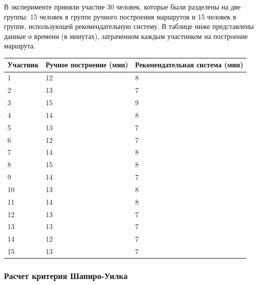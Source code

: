 В эксперименте приняли участие 30 человек, которые были разделены на две группы: 15 человек в группе ручного построения маршрутов и 15 человек в группе, использующей рекомендательную систему. В таблице ниже представлены данные о времени (в минутах), затраченном каждым участником на построение маршрута.

\begin{center}
	\label{tab:experiment_result}
	\begin{tabular}{|l|l|l|}
\hline
Участник & Ручное построение (мин) & Рекомендательная система (мин) \\ \hline
1        & 12                     & 8                             \\ \hline
2        & 13                     & 7                             \\ \hline
3        & 15                     & 9                             \\ \hline
4        & 14                     & 8                             \\ \hline
5        & 13                     & 7                             \\ \hline
6        & 12                     & 7                             \\ \hline
7        & 14                     & 8                             \\ \hline
8        & 15                     & 8                             \\ \hline
9        & 14                     & 7                             \\ \hline
10       & 13                     & 8                             \\ \hline
11       & 14                     & 8                             \\ \hline
12       & 13                     & 7                             \\ \hline
13       & 13                     & 7                             \\ \hline
14       & 12                     & 7                             \\ \hline
15       & 13                     & 7                             \\ \hline
	\end{tabular}
\end{center}


\subsubsection{Расчет критерия Шапиро-Уилка}

